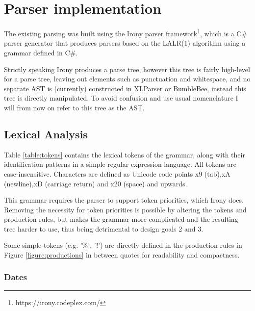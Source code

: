 \section{Parser implementation}

The existing parsing was built using the Irony parser framework\footnote{https://irony.codeplex.com/}, which is a C\# parser generator that produces parsers based on the LALR(1) algorithm using a grammar defined in C\#.

Strictly speaking Irony produces a parse tree, however this tree is fairly high-level for a parse tree, leaving out elements such as punctuation and whitespace, and no separate AST is (currently) constructed in XLParser or BumbleBee, instead this tree is directly manipulated.
To avoid confusion and use usual nomenclature I will from now on refer to this tree as the AST.

\subsection{Lexical Analysis}
\label{sec:lexanalysis}

\begin{table}
\tiny
\centerfloat

\caption{Lexical tokens used in the XLParser grammar, as refered to in section \ref{sec:lexanalysis}.}
\label{table:tokens}
\end{table}

Table \ref{table:tokens} contains the lexical tokens of the grammar, along with their identification patterns in a simple regular expression language. All tokens are case-insensitive.
Characters are defined as Unicode code points x9 (tab),xA (newline),xD (carriage return) and x20 (space) and upwards.

This grammar requires the parser to support token priorities, which Irony does.
Removing the necessity for token priorities is possible by altering the tokens and production rules, but makes the grammar more complicated and the resulting tree harder to use, thus being detrimental to design goals 2 and 3.

Some simple tokens (e.g. '\%', '!') are directly defined in the production rules in Figure \ref{figure:productions} in between quotes for readability and compactness.

\subsubsection{\textbf{Dates}}

